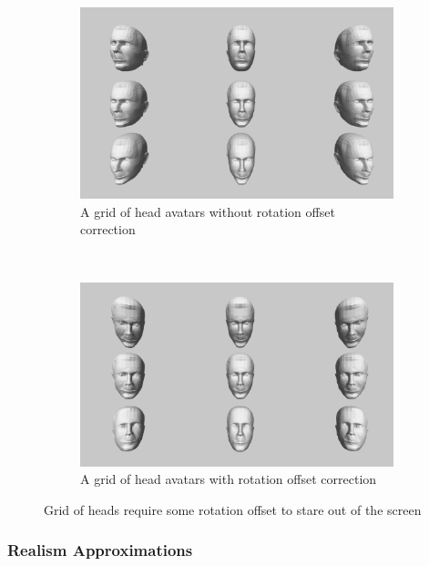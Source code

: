 
\begin{figure}
    \centering
    \begin{subfigure}[b]{0.6\textwidth}
        \includegraphics[width=\textwidth]{grid-nocorrect.png}
        \caption{A grid of head avatars without rotation offset correction}
    \end{subfigure}
    ~
    \begin{subfigure}[b]{0.6\textwidth}
        \includegraphics[width=\textwidth]{grid-correct.png}
        \caption{A grid of head avatars with rotation offset correction}
    \end{subfigure}
    \caption{Grid of heads require some rotation offset to stare out of the screen}
    \label{fig:rot-correct}
\end{figure}

\subsubsection{Realism Approximations}

